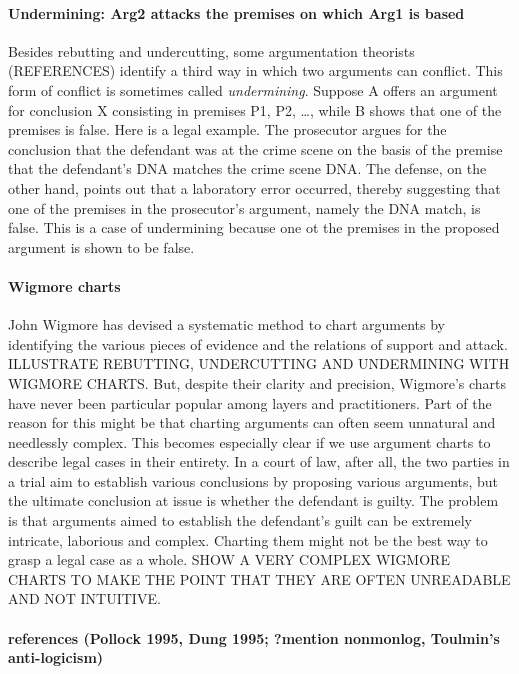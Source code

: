 \documentclass[10pt]{article}
\begin{document}
\paragraph{	Undermining: Arg2 attacks the premises on which Arg1 is based}

Besides rebutting and undercutting, some argumentation theorists (REFERENCES) identify a third way in which 
two arguments can conflict. This form of conflict is sometimes called \textit{undermining}.
Suppose A offers an argument for conclusion X consisting in premises P1, P2, \dots, 
while B shows that one of the premises is false. Here is a legal example. The prosecutor argues 
for the conclusion that the defendant was at the crime scene on the basis of the premise that the defendant's DNA 
matches the crime scene DNA. The defense, on the other hand, points out that 
a laboratory error occurred, thereby suggesting that one of the premises in the prosecutor's 
argument, namely the DNA match, is false. This is a case of undermining because one ot the premises 
in the proposed argument is shown to be false. 
 
\paragraph{Wigmore charts} 
John Wigmore has devised a systematic method to chart arguments by identifying the
 various pieces of evidence and the relations of support and attack. ILLUSTRATE REBUTTING, UNDERCUTTING AND UNDERMINING WITH WIGMORE CHARTS.
 But, despite their clarity and precision, Wigmore's charts have 
 never been particular popular among layers and practitioners. Part of the reason for this 
 might be that charting arguments can often seem unnatural and needlessly complex.
 This becomes especially clear if we use argument charts to describe legal cases in their entirety. 
 In a court of law, after all, the two parties in a trial aim to establish various conclusions by proposing various arguments, 
but the ultimate conclusion at issue is whether the defendant is guilty.  The problem is that arguments aimed to establish the defendant's guilt can 
be extremely intricate, laborious and complex.  Charting them might not be the best way to grasp a legal case as a whole.
SHOW A VERY COMPLEX WIGMORE CHARTS TO MAKE THE POINT THAT THEY 
  ARE OFTEN UNREADABLE AND NOT INTUITIVE. 
  
 \paragraph{references (Pollock 1995, Dung 1995; ?mention nonmonlog, Toulmin's anti-logicism)}
\end{document}
